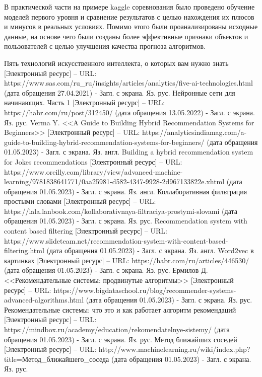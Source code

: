 \documentclass[bachelor, och, coursework]{SCWorks}
\begin{document}
В практической части на примере kaggle соревнования было проведено обучение моделей первого уровня и сравнение результатов с целью нахождения их плюсов и минусов
в реальных условиях. Помимо этого были проанализированы исходные данные, на основе чего были созданы более эффективные признаки объектов и пользователей с целью
улучшения качества прогноза алгоритмов.

\begin{thebibliography}{99}
    Пять технологий искусственного интеллекта, о которых вам нужно знать [Электронный ресурс] – URL: https://www.sas.com/ru_ru/insights/articles/analytics/five-ai-technologies.html (дата обращения 27.04.2021) - Загл. с экрана. Яз. рус.
    Нейронные сети для начинающих. Часть 1 [Электронный ресурс] – URL: https://habr.com/ru/post/312450/ (дата обращения 13.05.2022) - Загл. с экрана. Яз. рус.
    Verma Y. <<A Guide to Building Hybrid Recommendation Systems for Beginners>> [Электронный ресурс] – URL: https://analyticsindiamag.com/a-guide-to-building-hybrid-recommendation-systems-for-beginners/ (дата обращения 01.05.2023) - Загл. с экрана. Яз. англ.
    Building a hybrid recommendation system for Jokes recommendations [Электронный ресурс] – URL: https://www.oreilly.com/library/view/advanced-machine-learning/9781838641771/0aa25981-d582-4347-9928-2d967133822e.xhtml (дата обращения 01.05.2023) - Загл. с экрана. Яз. англ.
    Коллаборативная фильтрация простыми словами [Электронный ресурс] – URL: https://lala.lanbook.com/kollaborativnaya-filtraciya-prostymi-slovami (дата обращения 01.05.2023) - Загл. с экрана. Яз. рус.
    Recommendation system with content based filtering [Электронный ресурс] – URL: https://www.slideteam.net/recommendation-system-with-content-based-filtering.html (дата обращения 01.05.2023) - Загл. с экрана. Яз. англ.
    Word2vec в картинках [Электронный ресурс] – URL: https://habr.com/ru/articles/446530/ (дата обращения 01.05.2023) - Загл. с экрана. Яз. рус.
    Ермилов Д. <<Рекомендательные системы: продвинутые алгоритмы>> [Электронный ресурс] – URL: https://www.bigdataschool.ru/blog/recommender-systems-advanced-algorithms.html (дата обращения 01.05.2023) - Загл. с экрана. Яз. рус.
    Рекомендательные системы: что это и как работает алгоритм рекомендаций [Электронный ресурс] – URL: https://mindbox.ru/academy/education/rekomendatelnye-sistemy/ (дата обращения 01.05.2023) - Загл. с экрана. Яз. рус.
    Метод ближайших соседей [Электронный ресурс] – URL: http://www.machinelearning.ru/wiki/index.php?title=Метод_ближайшего_соседа (дата обращения 01.05.2023) - Загл. с экрана. Яз. рус.

\end{thebibliography}
\end{document}

